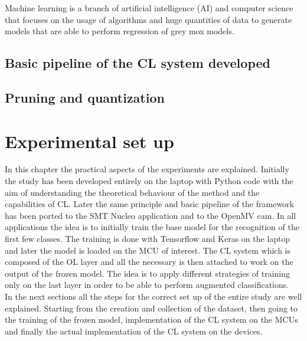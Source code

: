 \documentclass[12pt]{report}
\begin{document}
Machine learning is a branch of artificial intelligence (AI) and computer science that focuses on the usage of algorithms and huge quantities of data to generate models that are able to perform regression of grey mox models. 

\section{Basic pipeline of the CL system developed}

\section{Pruning and quantization}





\chapter{Experimental set up}

In this chapter the practical aspects of the experiments are explained. Initially the study has been developed entirely on the laptop with Python code with the aim of understanding the theoretical behaviour of the method and the capabilities of CL. Later the same principle and basic pipeline of the framework has been ported to the SMT Nucleo application and to the OpenMV cam. In all applications the idea is to initially train the base model for the recognition of the first few classes. The training is done with Tensorflow and Keras on the laptop and later the model is loaded on the MCU of interest. The CL system which is composed of the OL layer and all the necessary is then attached to work on the output of the frozen model. The idea is to apply different strategies of training only on the last layer in order to be able to perform augmented classifications.  \\
In the next sections all the steps for the correct set up of the entire study are well explained. Starting from the creation and collection of the dataset, then going to the training of the frozen model, implementation of the CL system on the MCUs and finally the actual implementation of the CL system on the devices. 
\end{document}
